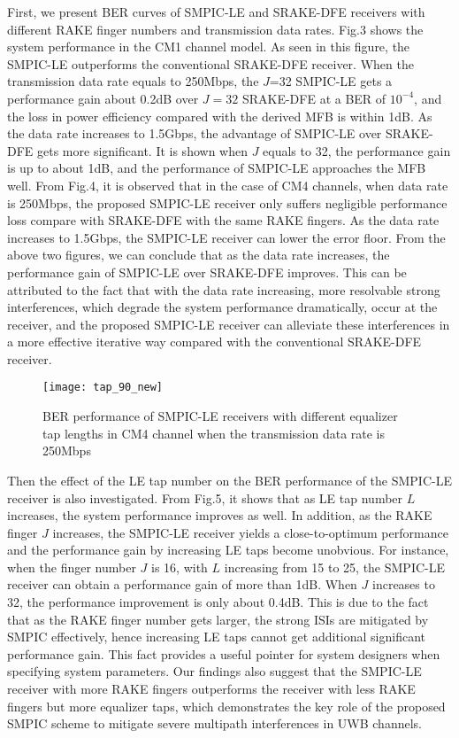 \documentclass[journal]{IEEEtran}
\begin{document}
First, we present BER curves of SMPIC-LE and SRAKE-DFE receivers
with different RAKE finger numbers and transmission data rates.
Fig.3 shows the system performance in the CM1 channel model. As seen
in this figure, the SMPIC-LE outperforms the conventional SRAKE-DFE
receiver. When the transmission data rate equals to 250Mbps, the
$J$=32 SMPIC-LE gets a performance gain about 0.2dB over $J=32$
SRAKE-DFE at a BER of $10^{-4}$, and the loss in power efficiency
compared with the derived MFB is within 1dB. As the data rate
increases to 1.5Gbps, the advantage of SMPIC-LE over SRAKE-DFE gets
more significant. It is shown when $J$ equals to 32, the performance
gain is up to about 1dB, and the performance of SMPIC-LE approaches
the MFB well. From Fig.4, it is observed that in the case of CM4
channels, when data rate is 250Mbps, the proposed SMPIC-LE receiver
only suffers negligible performance loss compare with SRAKE-DFE with
the same RAKE fingers. As the data rate increases to 1.5Gbps, the
SMPIC-LE receiver can lower the error floor. From the above two
figures, we can conclude that as the data rate increases, the
performance gain of SMPIC-LE over SRAKE-DFE improves. This can be
attributed to the fact that with the data rate increasing, more
resolvable strong interferences, which degrade the system
performance dramatically, occur at the receiver, and the proposed
SMPIC-LE receiver can alleviate these interferences in a more
effective iterative way compared with the conventional SRAKE-DFE
receiver.

\begin{figure}[t]
\begin{center}
  \texttt{[image: tap\_90\_new]}
  \caption{BER performance of SMPIC-LE receivers with different equalizer tap lengths in CM4 channel when the transmission data rate is 250Mbps}
  \label{tap}
\end{center}
\end{figure}

Then the effect of the LE tap number on the BER performance of the
SMPIC-LE receiver is also investigated. From Fig.5, it shows that as
LE tap number $L$ increases, the system performance improves as
well. In addition, as the RAKE finger $J$ increases, the SMPIC-LE
receiver yields a close-to-optimum performance and the performance
gain by increasing LE taps become unobvious. For instance, when the
finger number $J$ is 16, with $L$ increasing from 15 to 25, the
SMPIC-LE receiver can obtain a performance gain of more than 1dB.
When $J$ increases to 32, the performance improvement is only about
0.4dB. This is due to the fact that as the RAKE finger number gets
larger, the strong ISIs are mitigated by SMPIC effectively, hence
increasing LE taps cannot get additional significant performance
gain. This fact provides a useful pointer for system designers when
specifying system parameters. Our findings also suggest that the
SMPIC-LE receiver with more RAKE fingers outperforms the receiver
with less RAKE fingers but more equalizer taps, which demonstrates
the key role of the proposed SMPIC scheme to mitigate severe
multipath interferences in UWB channels.
\end{document}
